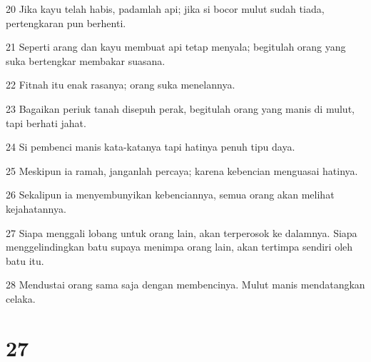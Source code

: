 \par 20 Jika kayu telah habis, padamlah api; jika si bocor mulut sudah tiada, pertengkaran pun berhenti.
\par 21 Seperti arang dan kayu membuat api tetap menyala; begitulah orang yang suka bertengkar membakar suasana.
\par 22 Fitnah itu enak rasanya; orang suka menelannya.
\par 23 Bagaikan periuk tanah disepuh perak, begitulah orang yang manis di mulut, tapi berhati jahat.
\par 24 Si pembenci manis kata-katanya tapi hatinya penuh tipu daya.
\par 25 Meskipun ia ramah, janganlah percaya; karena kebencian menguasai hatinya.
\par 26 Sekalipun ia menyembunyikan kebenciannya, semua orang akan melihat kejahatannya.
\par 27 Siapa menggali lobang untuk orang lain, akan terperosok ke dalamnya. Siapa menggelindingkan batu supaya menimpa orang lain, akan tertimpa sendiri oleh batu itu.
\par 28 Mendustai orang sama saja dengan membencinya. Mulut manis mendatangkan celaka.

\chapter{27}

